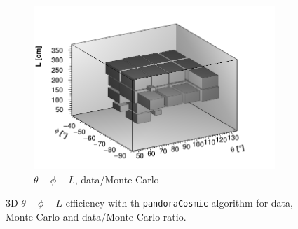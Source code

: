 \documentclass[a4paper]{scrartcl}
\begin{document}
\begin{figure}[htbp]
\begin{center}
\begin{subfigure}{0.52\textwidth}
    \includegraphics[width=\linewidth]{figures/ratio_theta_phi_l.png}
    \caption{$\theta - \phi - L$, data/Monte Carlo}\label{fig:3d_cry_ratio}
  \end{subfigure}
  \caption{3D $\theta - \phi - L$ efficiency with th \texttt{pandoraCosmic} algorithm for data, Monte Carlo and data/Monte Carlo ratio.} \label{fig:cry_mc_3d}
\end{center}
\end{figure}
\end{document}
